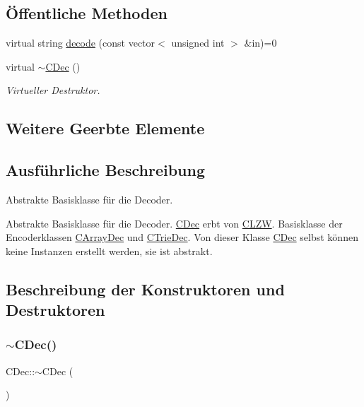 \subsection*{Öffentliche Methoden}
\begin{DoxyCompactItemize}
\item 
virtual string \hyperlink{class_c_dec_a88c60d9d4285714347a3bae0ef0a319d}{decode} (const vector$<$ unsigned int $>$ \&in)=0
\item 
virtual \hyperlink{class_c_dec_a66bbd291c322a9ca78c80284eb9c5acf}{$\sim$\+C\+Dec} ()
\begin{DoxyCompactList}\small\item\em Virtueller Destruktor. \end{DoxyCompactList}\end{DoxyCompactItemize}
\subsection*{Weitere Geerbte Elemente}


\subsection{Ausführliche Beschreibung}
Abstrakte Basisklasse für die Decoder. 

Abstrakte Basisklasse für die Decoder. \hyperlink{class_c_dec}{C\+Dec} erbt von \hyperlink{class_c_l_z_w}{C\+L\+ZW}. Basisklasse der Encoderklassen \hyperlink{class_c_array_dec}{C\+Array\+Dec} und \hyperlink{class_c_trie_dec}{C\+Trie\+Dec}. Von dieser Klasse \hyperlink{class_c_dec}{C\+Dec} selbst können keine Instanzen erstellt werden, sie ist abstrakt. 

\subsection{Beschreibung der Konstruktoren und Destruktoren}
\mbox{\label{class_c_dec_a66bbd291c322a9ca78c80284eb9c5acf}} 
\subsubsection{\texorpdfstring{$\sim$\+C\+Dec()}{~CDec()}}
{\footnotesize\ttfamily C\+Dec\+::$\sim$\+C\+Dec (\begin{DoxyParamCaption}{ }\end{DoxyParamCaption})\hspace{0.3cm}{\ttfamily [virtual]}}



